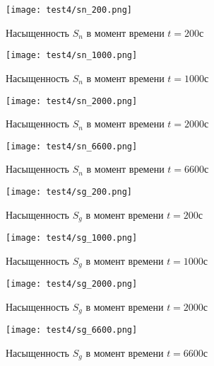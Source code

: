 \begin{figure}
  \begin{center}
    \begin{minipage}[h]{0.49\textwidth}
       \texttt{[image: test4/sn\_200.png]}
       \vspace{1cm}
       \caption{Насыщенность $S_n$ в момент времени $t=200$с}
    \end{minipage}
    \hfill
    \begin{minipage}[h]{0.49\textwidth}
       \texttt{[image: test4/sn\_1000.png]}
       \vspace{1cm}
       \caption{Насыщенность $S_n$ в момент времени $t=1000$с}
    \end{minipage}
    \vspace{3cm}
    \vfill
    \begin{minipage}[h]{0.49\textwidth}
       \texttt{[image: test4/sn\_2000.png]}
       \vspace{1cm}
       \caption{Насыщенность $S_n$ в момент времени $t=2000$с}
    \end{minipage}
    \hfill
    \begin{minipage}[h]{0.49\textwidth}
       \texttt{[image: test4/sn\_6600.png]}
       \vspace{1cm}
       \caption{Насыщенность $S_n$ в момент времени $t=6600$с}
    \end{minipage}
    \hfill  
  \end{center}
\end{figure}

\begin{figure}
  \begin{center}
    \begin{minipage}[h]{0.49\textwidth}
       \texttt{[image: test4/sg\_200.png]}
       \vspace{1cm}
       \caption{Насыщенность $S_g$ в момент времени $t=200$с}
    \end{minipage}
    \hfill
    \begin{minipage}[h]{0.49\textwidth}
       \texttt{[image: test4/sg\_1000.png]}
       \vspace{1cm}
       \caption{Насыщенность $S_g$ в момент времени $t=1000$с}
    \end{minipage}
    \vspace{3cm}
    \vfill
    \begin{minipage}[h]{0.49\textwidth}
       \texttt{[image: test4/sg\_2000.png]}
       \vspace{1cm}
       \caption{Насыщенность $S_g$ в момент времени $t=2000$с}
    \end{minipage}
    \hfill
    \begin{minipage}[h]{0.49\textwidth}
       \texttt{[image: test4/sg\_6600.png]}
       \vspace{1cm}
       \caption{Насыщенность $S_g$ в момент времени $t=6600$с}
       \label{t4_pic_end}
    \end{minipage}
    \hfill  
  \end{center}
\end{figure}
